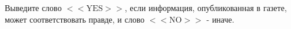 Выведите слово $<<\text{YES}>>$, если информация, опубликованная в газете, может соответствовать правде, и слово $<<\text{NO}>>$ - иначе.